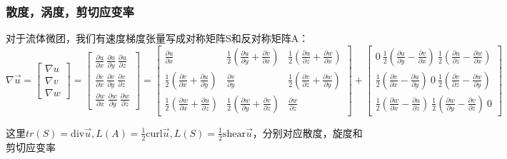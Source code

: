 \documentclass{article}
\begin{document}
\subsubsection{散度，涡度，剪切应变率}

对于流体微团，我们有速度梯度张量写成对称矩阵S和反对称矩阵A：
$$\nabla\vec{u} = \begin{bmatrix}
\nabla u\\
\nabla v\\
\nabla w
\end{bmatrix}  = \begin{bmatrix}
\frac{\partial u}{\partial x}\ \frac{\partial u}{\partial y}\ \frac{\partial u}{\partial z} \\
\frac{\partial v}{\partial x}\ \frac{\partial v}{\partial y}\ \frac{\partial v}{\partial z} \\
\frac{\partial w}{\partial x}\ \frac{\partial w}{\partial y}\ \frac{\partial w}{\partial z}
\end{bmatrix}  = \begin{bmatrix}
\frac{\partial u}{\partial x}&
\frac{1}{2}(\frac{\partial u}{\partial y}+\frac{\partial v}{\partial x})&
\frac{1}{2}(\frac{\partial u}{\partial z}+\frac{\partial w}{\partial x})\\
\frac{1}{2}(\frac{\partial v}{\partial x}+\frac{\partial u}{\partial y})&
\frac{\partial v}{\partial y}&
\frac{1}{2}(\frac{\partial v}{\partial z}+\frac{\partial w}{\partial y}) \\
\frac{1}{2}(\frac{\partial w}{\partial x}+\frac{\partial u}{\partial z})&
\frac{1}{2}(\frac{\partial w}{\partial y}+\frac{\partial v}{\partial z})&
\frac{\partial w}{\partial z}
\end{bmatrix}+\begin{bmatrix}
0\ 
\frac{1}{2}(\frac{\partial u}{\partial y}-\frac{\partial v}{\partial x})\ 
\frac{1}{2}(\frac{\partial u}{\partial z}-\frac{\partial w}{\partial x})\\
\frac{1}{2}(\frac{\partial v}{\partial x}-\frac{\partial u}{\partial y})\
0\
\frac{1}{2}(\frac{\partial v}{\partial z}-\frac{\partial w}{\partial y}) \\
\frac{1}{2}(\frac{\partial w}{\partial x}-\frac{\partial u}{\partial z})\
\frac{1}{2}(\frac{\partial w}{\partial y}-\frac{\partial v}{\partial z})\
0
\end{bmatrix} $$

这里$tr(S) = \text{div}\vec{u}, L(A) = \frac{1}{2}\text{curl}\vec{u}, L(S)=\frac{1}{2}\text{shear}\vec{u}$，分别对应散度，旋度和剪切应变率
\end{document}
